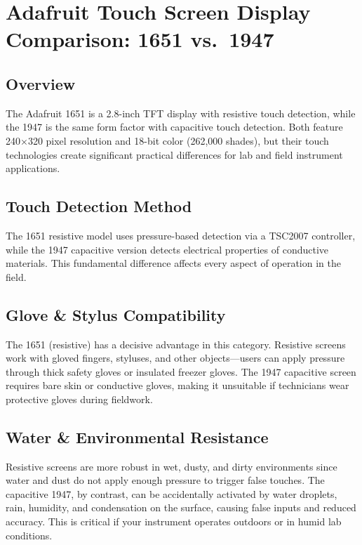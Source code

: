 \section{Adafruit Touch Screen Display Comparison: 1651 vs.\ 1947}

\subsection{Overview}

The Adafruit 1651 is a 2.8-inch TFT display with resistive touch detection, while the 1947 is the same form factor with capacitive touch detection. Both feature 240×320 pixel resolution and 18-bit color (262,000 shades), but their touch technologies create significant practical differences for lab and field instrument applications.

\subsection{Touch Detection Method}

The 1651 resistive model uses pressure-based detection via a TSC2007 controller, while the 1947 capacitive version detects electrical properties of conductive materials. This fundamental difference affects every aspect of operation in the field.

\subsection{Glove \& Stylus Compatibility}

The 1651 (resistive) has a decisive advantage in this category. Resistive screens work with gloved fingers, styluses, and other objects---users can apply pressure through thick safety gloves or insulated freezer gloves. The 1947 capacitive screen requires bare skin or conductive gloves, making it unsuitable if technicians wear protective gloves during fieldwork.

\subsection{Water \& Environmental Resistance}

Resistive screens are more robust in wet, dusty, and dirty environments since water and dust do not apply enough pressure to trigger false touches. The capacitive 1947, by contrast, can be accidentally activated by water droplets, rain, humidity, and condensation on the surface, causing false inputs and reduced accuracy. This is critical if your instrument operates outdoors or in humid lab conditions.

